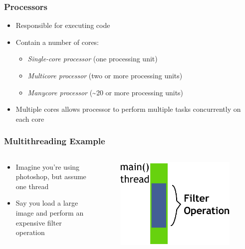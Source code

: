 \documentclass{beamer}
\newcommand{\linespace}{\vskip 0.25cm}
\begin{document}
\begin{frame}
\frametitle{Processors}
	\begin{itemize}
	\item Responsible for executing code
	\linespace
	\item Contain a number of cores:
	\begin{itemize}
		\item \emph{Single-core processor} (one processing unit) 
		\item \emph{Multicore processor} (two or more processing units)
		\item \emph{Manycore processor} (\textasciitilde20 or more processing units)
	\end{itemize}
	\linespace
	\item Multiple cores allows processor to perform multiple tasks concurrently on each core
	\end{itemize}
\end{frame}

\begin{frame}
\frametitle{Multithreading Example}

\begin{columns}
	\begin{column}{0.5\textwidth}
		\linespace
		\begin{itemize}
		\item Imagine you're using photoshop, but assume one thread
		\item Say you load a large image and perform an expensive filter operation
		\end{itemize}
		\end{column}
	\begin{column}{0.5\textwidth}
		\begin{figure}
		\includegraphics[width=0.95\textwidth]{Illustrations/ThreadExample_GUI_Part1}
		\label{fig:single_photoshop}
		\end{figure}
	\end{column}
\end{columns}

\end{frame}
\end{document}
